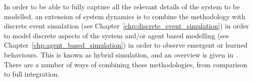 In order to be able to fully capture all the relevant details of the system to be
modelled, an extension of system dynamics is to combine the methodology
with discrete event simulation (see Chapter~\ref{chp:discrete_event_simulation})
in order to model discrete aspects of the system
and/or agent based modelling (see Chapter~\ref{chp:agent_based_simulation}) in
order to observe emergent or learned
behaviours. This is known as hybrid simulation, and an overview is given
in~\parencite{brailsford2019hybrid}. There are a number of ways of
combining these methodologies, from comparison to full integration.
